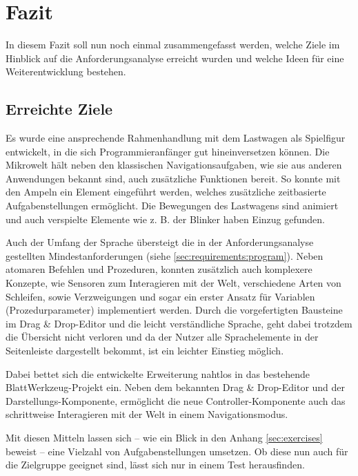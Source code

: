 \chapter{Fazit}
\label{sec:conclusion}

In diesem Fazit soll nun noch einmal zusammengefasst werden, welche Ziele im Hinblick auf die Anforderungsanalyse erreicht wurden und welche Ideen für eine Weiterentwicklung bestehen.

\section{Erreichte Ziele}
\label{sec:conclusion:archived}

Es wurde eine ansprechende Rahmenhandlung mit dem Lastwagen als Spielfigur entwickelt, in die sich Programmieranfänger gut hineinversetzen können. Die Mikrowelt hält neben den klassischen Navigationsaufgaben, wie sie aus anderen Anwendungen bekannt sind, auch zusätzliche Funktionen bereit. So konnte mit den Ampeln ein Element eingeführt werden, welches zusätzliche zeitbasierte Aufgabenstellungen ermöglicht. Die Bewegungen des Lastwagens sind animiert und auch verspielte Elemente wie z. B. der Blinker haben Einzug gefunden.

Auch der Umfang der Sprache übersteigt die in der Anforderungsanalyse gestellten Mindestanforderungen (siehe \ref{sec:requirements:program}). Neben atomaren Befehlen und Prozeduren, konnten zusätzlich auch komplexere Konzepte, wie Sensoren zum Interagieren mit der Welt, verschiedene Arten von Schleifen, sowie Verzweigungen und sogar ein erster Ansatz für Variablen (Prozedurparameter) implementiert werden. Durch die vorgefertigten Bausteine im Drag \& Drop-Editor und die leicht verständliche Sprache, geht dabei trotzdem die Übersicht nicht verloren und da der Nutzer alle Sprachelemente in der Seitenleiste dargestellt bekommt, ist ein leichter Einstieg möglich.

Dabei bettet sich die entwickelte Erweiterung nahtlos in das bestehende BlattWerkzeug-Projekt ein. Neben dem bekannten Drag \& Drop-Editor und der Darstellungs-Komponente, ermöglicht die neue Controller-Komponente auch das schrittweise Interagieren mit der Welt in einem Navigationsmodus.

Mit diesen Mitteln lassen sich -- wie ein Blick in den Anhang \ref{sec:exercises} beweist -- eine Vielzahl von Aufgabenstellungen umsetzen. Ob diese nun auch für die Zielgruppe geeignet sind, lässt sich nur in einem Test herausfinden.

